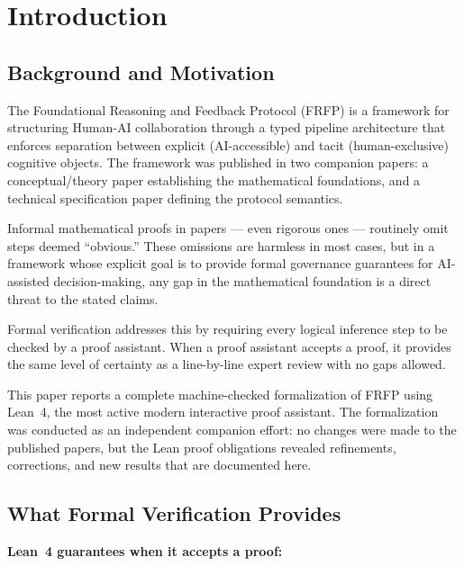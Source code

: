 \section{Introduction}
\label{ch:intro}

\subsection{Background and Motivation}

The Foundational Reasoning and Feedback Protocol (FRFP) is a framework for
structuring Human-AI collaboration through a typed pipeline architecture that
enforces separation between explicit (AI-accessible) and tacit
(human-exclusive) cognitive objects. The framework was published in two companion
papers: a conceptual/theory paper establishing the mathematical foundations, and a
technical specification paper defining the protocol semantics.

Informal mathematical proofs in papers --- even rigorous ones --- routinely omit
steps deemed ``obvious.'' These omissions are harmless in most cases, but in a
framework whose explicit goal is to provide formal governance guarantees for
AI-assisted decision-making, any gap in the mathematical foundation is a direct
threat to the stated claims.

Formal verification addresses this by requiring every logical inference step to be
checked by a proof assistant. When a proof assistant accepts a proof, it provides
the same level of certainty as a line-by-line expert review with no gaps allowed.

This paper reports a complete machine-checked formalization of FRFP using Lean~4,
the most active modern interactive proof assistant. The formalization was conducted
as an independent companion effort: no changes were made to the published papers,
but the Lean proof obligations revealed refinements, corrections, and new results
that are documented here.

\subsection{What Formal Verification Provides}

\textbf{Lean~4 guarantees when it accepts a proof:}

